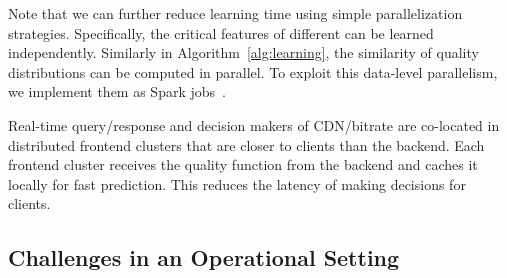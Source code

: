 

Note that we can further reduce learning time
 using simple parallelization strategies. 
Specifically, the critical features of different \leafs 
can be learned independently.
Similarly in Algorithm~\ref{alg:learning}, the 
similarity  of quality distributions can be 
computed in parallel. 
To exploit this data-level parallelism, 
we implement them as Spark jobs~\cite{spark}. 



Real-time query/response and 
decision makers of CDN/bitrate are co-located in 
distributed frontend clusters that are closer to 
clients than the backend.
Each frontend cluster receives the quality function 
from the backend and caches it locally for fast
prediction.
This reduces the latency of making decisions 
for clients.
 







\subsection{Challenges in an Operational Setting}
\label{subsec:cfa:impl:challenge}

